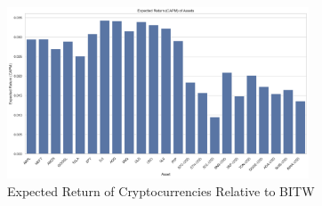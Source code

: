 \begin{figure}
    \centering
    \includegraphics[width=0.8\textwidth]{./code/risk-and-return-analysis/capm/exp_return_assets.png}
    \caption{Expected Return of Cryptocurrencies Relative to BITW}
    \label{fig:exp_return}
\end{figure}